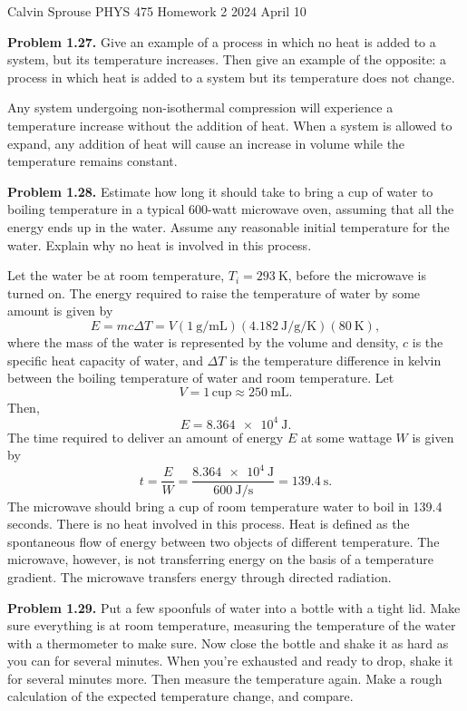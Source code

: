 \documentclass[a4paper, 12pt]{config/homework}
\begin{document}
\noindent
\hfill Calvin Sprouse \hfill PHYS 475 Homework 2 \hfill 2024 April 10 \hfill
\bigskip

\bigskip\noindent \textbf{Problem 1.27.}
Give an example of a process in which no heat is added to a system, but its temperature increases. Then give an example of the opposite: a process in which heat is added to a system but its temperature does not change.

\bigskip\noindent
Any system undergoing non-isothermal compression will experience a temperature increase without the addition of heat. When a system is allowed to expand, any addition of heat will cause an increase in volume while the temperature remains constant.

\bigskip\noindent \textbf{Problem 1.28.}
Estimate how long it should take to bring a cup of water to boiling temperature in a typical 600-watt microwave oven, assuming that all the energy ends up in the water. Assume any reasonable initial temperature for the water. Explain why no heat is involved in this process.

\bigskip\noindent
Let the water be at room temperature, \(T_i = \qty{293}{\kelvin}\), before the microwave is turned on. The energy required to raise the temperature of water by some amount is given by
\[E = m c \Delta T = V\left(\qty{1}{\gram\per\milli\liter}\right)\left(\qty{4.182}{\joule\per\gram\per\kelvin}\right)\left(\qty{80}{\kelvin}\right),\]
where the mass of the water is represented by the volume and density, \(c\) is the specific heat capacity of water, and \(\Delta T\) is the temperature difference in kelvin between the boiling temperature of water and room temperature. Let
\[V=1\,\text{cup}\approx\qty{250}{\milli\liter}.\]
Then,
\[E = \qty{8.364e4}{\joule}.\]
The time required to deliver an amount of energy \(E\) at some wattage \(W\) is given by
\[t = \frac{E}{W} = \frac{\qty{8.364e4}{\joule}}{\qty{600}{\joule\per\second}} = \qty{139.4}{\second}.\]
The microwave should bring a cup of room temperature water to boil in 139.4 seconds. There is no heat involved in this process. Heat is defined as the spontaneous flow of energy between two objects of different temperature. The microwave, however, is not transferring energy on the basis of a temperature gradient. The microwave transfers energy through directed radiation.


\pagebreak\noindent
\textbf{Problem 1.29.} Put a few spoonfuls of water into a bottle with a tight lid. Make sure everything is at room temperature, measuring the temperature of the water with a thermometer to make sure. Now close the bottle and shake it as hard as you can for several minutes. When you're exhausted and ready to drop, shake it for several minutes more. Then measure the temperature again. Make a rough calculation of the expected temperature change, and compare.
\end{document}
